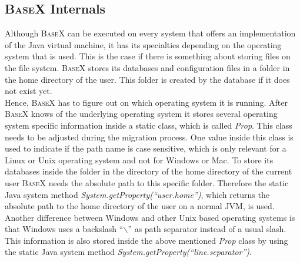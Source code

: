 \subsection{\textsc{BaseX} Internals}
\label{sec:migration:basex-internals}
Although \textsc{BaseX} can be executed on every system that offers an implementation of the Java virtual machine, it has its specialties depending on the operating system that is used.
This is the case if there is something about storing files on the file system.
\textsc{BaseX} stores its databases and configuration files in a folder in the home directory of the user.
This folder is created by the database if it does not exist yet.\\
Hence, \textsc{BaseX} has to figure out on which operating system it is running.
After \textsc{BaseX} knows of the underlying operating system it stores several operating system specific information inside a static class, which is called \textit{Prop}. 
This class needs to be adjusted during the migration process.
One value inside this class is used to indicate if the path name is case sensitive, which is only relevant for a Linux or Unix operating system and not for Windows or Mac.
To store its databases inside the folder in the directory of the home directory of the current user \textsc{BaseX} needs the absolute path to this specific folder.
Therefore the static Java system method \textit{System.getProperty(``user.home'')}, which returns the absolute path to the home directory of the user on a normal JVM, is used.\\
Another difference between Windows and other Unix based operating systems is that Windows uses a backslash ``\textit{$\backslash$}'' as path separator instead of a usual slash.
This information is also stored inside the above mentioned \textit{Prop} class by using the static Java system method \textit{System.getProperty(``line.separator'')}.

